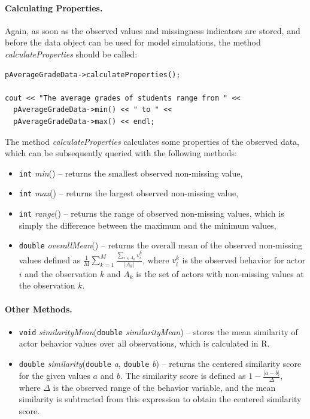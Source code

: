 \documentclass[12pt]{article}
\renewcommand{\=}{\,=\,}
\newcommand{\+}{\,+\,}
\newcommand{\nnm}[1]{\textsf{\small\textit{#1}}}
\begin{document}
\paragraph{Calculating Properties.}
Again, as soon as the observed values and missingness indicators are stored, and
before the data object can be used for model simulations, the method
\nnm{calculateProperties} should be called:
\begin{verbatim}
pAverageGradeData->calculateProperties();

cout << "The average grades of students range from " <<
  pAverageGradeData->min() << " to " <<
  pAverageGradeData->max() << endl;
\end{verbatim}
The method \nnm{calculateProperties} calculates some properties of the
observed data, which can be subsequently queried with the following methods:
\begin{itemize}
\item \verb|int| \nnm{min}() -- returns the smallest observed non-missing value,
\item \verb|int| \nnm{max}() -- returns the largest observed non-missing value,
\item \verb|int| \nnm{range}() -- returns the range of observed non-missing
values, which is simply the difference between the maximum and the minimum
values,
\item \verb|double| \nnm{overallMean}() -- returns the overall mean of the
observed non-missing values defined as
$\frac{1}{M}\sum_{k=1}^{M} \frac{\sum_{i \in A_k} v_i^k}{|A_k|}$, where $v_i^k$
is the observed behavior for actor $i$ and the observation $k$ and $A_k$ is the
set of actors with non-missing values at the observation $k$.
\end{itemize}

\paragraph{Other Methods.}
\begin{itemize}
\item \verb|void| \nnm{similarityMean}(\verb|double| \nnm{similarityMean}) --
stores the mean similarity of actor behavior values over all
observations, which is calculated in R.
\item \verb|double| \nnm{similarity}(\verb|double| \nnm{a},
\verb|double| \nnm{b}) -- returns the centered similarity score for the given
values $a$ and $b$. The similarity score is defined as
$1 - \frac{|a-b|}{\Delta}$, where $\Delta$ is the observed range of the
behavior variable, and the mean similarity is subtracted from this expression to
obtain the centered similarity score.
\end{itemize}
\end{document}
